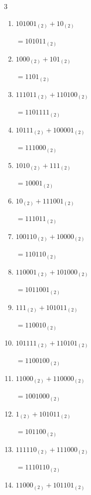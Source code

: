 \begin{multicols}{3}
\begin{enumerate}
        $=1011100_{(2)}$

  \item $101001_{(2)} + 10_{(2)}$

        $=101011_{(2)}$

  \item $1000_{(2)} + 101_{(2)}$

        $=1101_{(2)}$

\columnbreak %

  \item $111011_{(2)} + 110100_{(2)}$

        $=1101111_{(2)}$

  \item $10111_{(2)} + 100001_{(2)}$

        $=111000_{(2)}$

  \item $1010_{(2)} + 111_{(2)}$

        $=10001_{(2)}$

  \item $10_{(2)} + 111001_{(2)}$

        $=111011_{(2)}$

  \item $100110_{(2)} + 10000_{(2)}$

        $=110110_{(2)}$

  \item $110001_{(2)} + 101000_{(2)}$

        $=1011001_{(2)}$

  \item $111_{(2)} + 101011_{(2)}$

        $=110010_{(2)}$

  \item $101111_{(2)} + 110101_{(2)}$

        $=1100100_{(2)}$

  \item $11000_{(2)} + 110000_{(2)}$

        $=1001000_{(2)}$

  \item $1_{(2)} + 101011_{(2)}$

        $=101100_{(2)}$

\columnbreak %

  \item $111110_{(2)} + 111000_{(2)}$

        $=1110110_{(2)}$

  \item $11000_{(2)} + 101101_{(2)}$


\end{enumerate}
\end{multicols}
